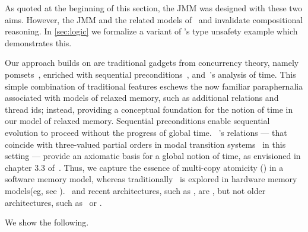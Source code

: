 As quoted at the beginning of this section, the JMM was designed with these two aims.  However, the JMM and the related models of~\citet{DBLP:conf/esop/JagadeesanPR10} and \citet{DBLP:conf/popl/KangHLVD17} invalidate compositional reasoning.  In \textsection\ref{sec:logic} we formalize a variant of \citeauthor{DBLP:journals/toplas/Lochbihler13}'s type unsafety example which demonstrates this.  

Our approach builds on are  traditional gadgets from concurrency theory, namely pomsets~\citep{Plotkin:1997:TSP:266557.266600}, enriched with sequential preconditions~\citep{Hoare:1969:ABC:363235.363259}, and~\citet{DBLP:journals/dc/Lamport86}'s  analysis of time.   This simple combination of traditional features eschews the now familiar paraphernalia associated with models of relaxed memory, such as  additional relations and thread ids; instead, providing a conceptual foundation for the notion of time in our model of relaxed memory.  Sequential preconditions enable sequential evolution to proceed without the progress of global time.  ~\citet{DBLP:journals/dc/Lamport86}'s relations --- that coincide with  three-valued partial orders in modal transition systems~\citep{DBLP:conf/avmfss/Larsen89,DBLP:conf/esop/HuthJS01} in this setting --- provide an axiomatic basis for a global notion of time, as envisioned in chapter 3.3 of~\citet{AlglaveThesis}.  Thus, we  capture the essence of multi-copy atomicity (\mca) in a software memory model, whereas traditionally \mca\ is explored in hardware memory models(eg, see \citet{DBLP:journals/pacmpl/PulteFDFSS18}).  
\tso\ and recent architectures, such as \armeight, are \mca, but not older architectures, such as \ppc\ or \armseven.

We show the following.



